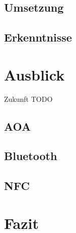 \documentclass[12pt,journal,compsoc]{IEEEtran}
\begin{document}
\subsection{Umsetzung}

\subsection{Erkenntnisse}





\section{Ausblick}
Zukunft TODO
\subsection{AOA}

\subsection{Bluetooth}

\subsection{NFC}
\section{Fazit}









\nocite{*}
\end{document}
